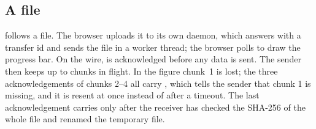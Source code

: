 
\subsection{A file}
 follows a file. The browser uploads it to its own daemon, which answers
 with a transfer id and sends the file in a worker thread; the browser polls
 to draw the progress bar. On the wire,  is acknowledged before any
data is sent. The sender then keeps up to  chunks in flight. In the figure chunk~1 is lost;
the three acknowledgements of chunks 2--4 all carry , which tells the sender that chunk
1 is missing, and it is resent at once instead of after a timeout. The last acknowledgement carries
 only after the receiver has checked the SHA-256 of the whole file and renamed
the temporary  file.

